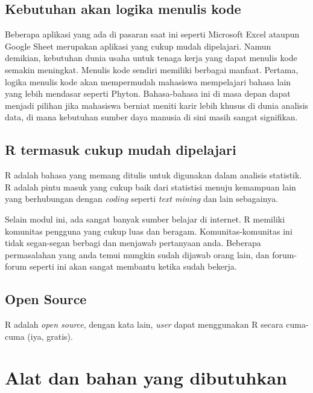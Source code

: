 \documentclass[
]{book}
\begin{document}
\hypertarget{kebutuhan-akan-logika-menulis-kode}{%
\subsection{Kebutuhan akan logika menulis kode}\label{kebutuhan-akan-logika-menulis-kode}}

Beberapa aplikasi yang ada di pasaran saat ini seperti Microsoft Excel ataupun Google Sheet merupakan aplikasi yang cukup mudah dipelajari. Namun demikian, kebutuhan dunia usaha untuk tenaga kerja yang dapat menulis kode semakin meningkat. Menulis kode sendiri memiliki berbagai manfaat. Pertama, logika menulis kode akan mempermudah mahasiswa mempelajari bahasa lain yang lebih mendasar seperti Phyton. Bahasa-bahasa ini di masa depan dapat menjadi pilihan jika mahasiswa berniat meniti karir lebih khusus di dunia analisis data, di mana kebutuhan sumber daya manusia di sini masih sangat signifikan.

\hypertarget{r-termasuk-cukup-mudah-dipelajari}{%
\subsection{R termasuk cukup mudah dipelajari}\label{r-termasuk-cukup-mudah-dipelajari}}

R adalah bahasa yang memang ditulis untuk digunakan dalam analisis statistik. R adalah pintu masuk yang cukup baik dari statistisi menuju kemampuan lain yang berhubungan dengan \emph{coding} seperti \emph{text mining} dan lain sebagainya.

Selain modul ini, ada sangat banyak sumber belajar di internet. R memiliki komunitas pengguna yang cukup luas dan beragam. Komunitas-komunitas ini tidak segan-segan berbagi dan menjawab pertanyaan anda. Beberapa permasalahan yang anda temui mungkin sudah dijawab orang lain, dan forum-forum seperti ini akan sangat membantu ketika sudah bekerja.

\hypertarget{open-source}{%
\subsection{Open Source}\label{open-source}}

R adalah \emph{open source}, dengan kata lain, \emph{user} dapat menggunakan R secara cuma-cuma (iya, gratis).

\hypertarget{alat-dan-bahan-yang-dibutuhkan}{%
\section{Alat dan bahan yang dibutuhkan}\label{alat-dan-bahan-yang-dibutuhkan}}
\end{document}
